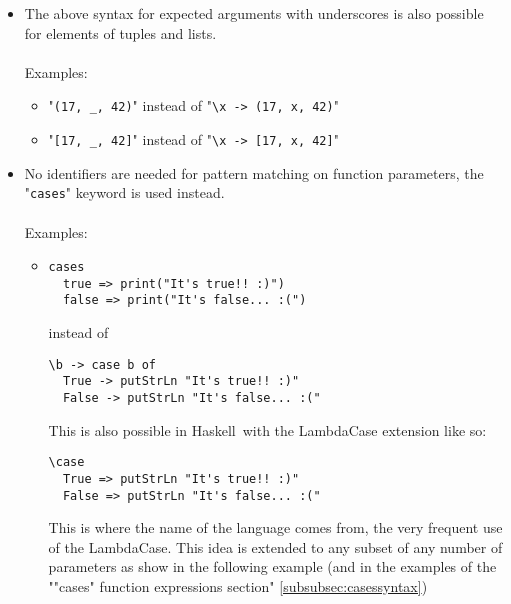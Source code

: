 \documentclass{article}
\def\H{Haskell}
\begin{document}
\begin{itemize}
\begin{itemize}


\item
"\verb|"Hello " + _ + "! You look much younger than " + _ + "!"|"
\\ instead of \\
"\verb|\name age -> "Hello " ++ name ++ "! You look much younger than " + age + "!"|"

\item
"\verb|_^2 + _^2|" instead of "\verb|\x y -> x^2 + y^2|"

\item
etc

\end{itemize}

\item
The above syntax for expected arguments with underscores is also possible
for elements of tuples and lists.
\\\\
Examples:\\
\begin{itemize}

\item
"\verb|(17, _, 42)|" instead of "\verb|\x -> (17, x, 42)|"

\item
"\verb|[17, _, 42]|" instead of "\verb|\x -> [17, x, 42]|"

\end{itemize}

\newpage
\item
No identifiers are needed for pattern matching on function parameters,
the "\texttt{cases}" keyword is used instead.
\\\\
Examples:\\

\begin{itemize}

\item
\begin{verbatim}
cases
  true => print("It's true!! :)")
  false => print("It's false... :(")
\end{verbatim}
instead of
\begin{verbatim}
\b -> case b of
  True -> putStrLn "It's true!! :)"
  False -> putStrLn "It's false... :("
\end{verbatim}
This is also possible in \H\ with the LambdaCase extension like so:
\begin{verbatim}
\case
  True => putStrLn "It's true!! :)"
  False => putStrLn "It's false... :("
\end{verbatim}
This is where the name of the language comes from, the very frequent use
of the LambdaCase. This idea is extended to any subset of any number of
parameters as show in the following example (and in the examples of
the ""cases" function expressions section" \ref{subsubsec:casessyntax})


\end{itemize}
\end{itemize}
\end{document}

